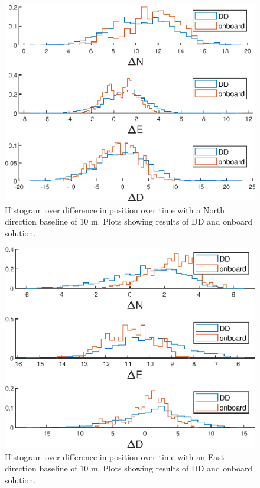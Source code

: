 \begin{figure}[!htb]
\includegraphics[width=\textwidth]{Results/Nhist.eps}
\caption{\label{fig:DDandInternalN} Histogram over difference in position over time with a North direction baseline of 10 m. Plots showing results of DD and onboard solution.}
\end{figure}
\begin{figure}[!htb]
\includegraphics[width=\textwidth]{Results/Ehist.eps}
\caption{\label{fig:DDandInternalE} Histogram over difference in position over time with an East direction baseline of 10 m. Plots showing results of DD and onboard solution.}
\end{figure}

